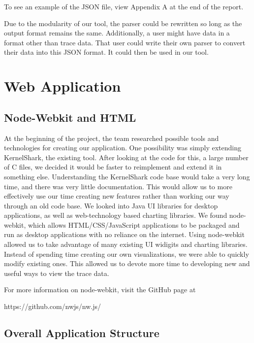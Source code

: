 \documentclass{hmcclinic}
\begin{document}
  To see an example of the JSON file, view Appendix A at the end of the report.
  \newline
  \newline
  
  Due to the modularity of our tool, the parser could be rewritten so long as
  the output format remains the same. Additionally, a user might have data
  in a format other than trace data. That user could write their own parser to
  convert their data into this JSON format. It could then be used in our tool.

  \section{Web Application}

  
  \subsection{Node-Webkit and HTML} %
    At the beginning of the project, the team researched possible tools and
    technologies for creating our application. One possibility was simply
    extending KernelShark, the existing tool. After looking at the code for
    this, a large number of C files, we decided it would be faster to
    reimplement and extend it in something else. Understanding the KernelShark code base
    would take a very long time, and there was very little documentation. This
    would allow us to more effectively use our time creating new features rather
    than working our way through an old code base. We
    looked into Java UI libraries for desktop applications, as well as
    web-technology based charting libraries.  We found node-webkit, which allows
    HTML/CSS/JavaScript applications to be packaged and run as desktop
    applications with no reliance on the internet. 
    Using node-webkit allowed us to take advantage of many existing UI widigits
    and charting libraries. Instead of spending time creating our own
    visualizations, we were able to quickly modify existing ones. This allowed
    us to devote more time to developing new and useful ways to view the trace
    data.

For more information on node-webkit, visit the GitHub page at 
\begin{center}https://github.com/nwjs/nw.js/\end{center}

  \subsection{Overall Application Structure}
\end{document}
